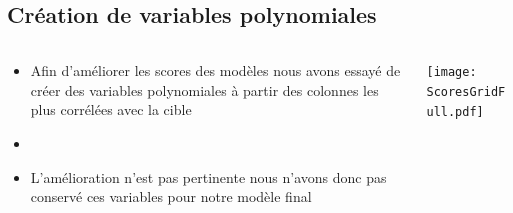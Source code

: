 \documentclass[8pt,aspectratio=169,hyperref={unicode=true}]{beamer}
\begin{document}
\subsection{Création de variables polynomiales}
\begin{frame}{\insertsection}{\insertsubsection}
    \vspace{2pt}
    \begin{columns}
        \begin{column}{.5\textwidth}
            \begin{itemize}
                \item Afin d'améliorer les scores des modèles nous avons essayé de créer des variables polynomiales à partir des colonnes les plus corrélées avec la cible
                \item[]
                \item L'amélioration n'est pas pertinente nous n'avons donc pas conservé ces variables pour notre modèle final
            \end{itemize}
        \end{column}
        \begin{column}{.5\textwidth}
            \texttt{[image: ScoresGridFull.pdf]}
        \end{column}
    \end{columns}
\end{frame}
\end{document}
